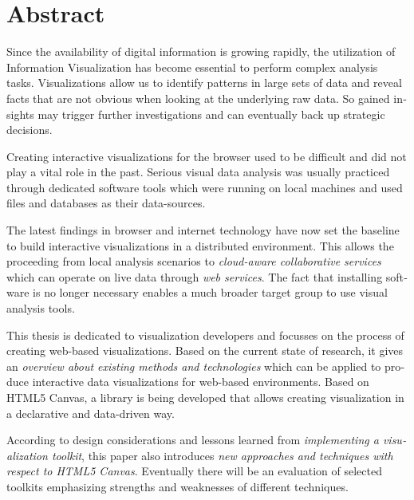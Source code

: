 \chapter{Abstract}

\begin{english} %

Since the availability of digital information is growing rapidly, the utilization of Information Visualization has become essential to perform complex analysis tasks. Visualizations allow us to identify patterns in large sets of data and reveal facts that are not obvious when looking at the underlying raw data. So gained insights may trigger further investigations and can eventually back up strategic decisions.

Creating interactive visualizations for the browser used to be difficult and did not play a vital role in the past. Serious visual data analysis was usually practiced through dedicated software tools which were running on local machines and used files and databases as their data-sources. 

The latest findings in browser and internet technology have now set the baseline to build interactive visualizations in a distributed environment. This allows the proceeding from local analysis scenarios to \emph{cloud-aware collaborative services} which can operate on live data through \emph{web services}. The fact that installing software is no longer necessary enables a much broader target group to use visual analysis tools.

This thesis is dedicated to visualization developers and focusses on the process of creating web-based visualizations. Based on the current state of research, it gives an \emph{overview about existing methods and technologies} which can be applied to produce interactive data visualizations for web-based environments. Based on HTML5 Canvas, a library is being developed that allows creating visualization in a declarative and data-driven way.

According to design considerations and lessons learned from \emph{implementing a visualization toolkit}, this paper also introduces \emph{new approaches and techniques with respect to HTML5 Canvas}. Eventually there will be an evaluation of selected toolkits emphasizing strengths and weaknesses of different techniques.

\end{english}
